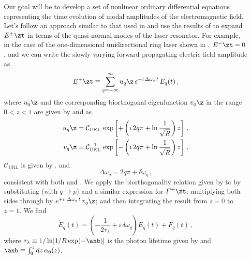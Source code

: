 Our goal will be to develop a set of nonlinear ordinary differential equations representing the time evolution of modal amplitudes of the electromagnetic field. Let's follow an approach similar to that used in  and use the results of  to expand $E^\pm\zt$ in terms of the quasi-normal modes of the laser resonator. For example, in the case of the one-dimensional unidirectional ring laser shown in , $E^{-}\zt = 0$, and we can write the slowly-varying forward-propagating electric field amplitude as
\begin{equation}
  \label{eqn:mml_e_1d_zt_url}
  E^{+}\zt \equiv \sum_{q = -\infty}^\infty u_q\z\, e^{-i\, \Delta \omega_q\, t}\, E_q(t)\, ,
\end{equation}
where $u_q\z$ and the corresponding biorthogonal eigenfunction $v_q\z$ in the range $0 < z < 1$ are given by  and  as
\begin{subequations}
  \begin{align}
    \label{eqn:sml_1d_uq_url} u_q\z &=\mathcal{C}_\mathrm{URL}\, \exp\left[ +\left( i\, 2 q \pi + \ln\frac{1}{\sqrt{R}} \right) z \right]\, , \\
    \label{eqn:sml_1d_vq_url} v_q\z &=\mathcal{C}^{-1}_\mathrm{URL}\, \exp\left[ -\left( i\, 2 q \pi + \ln\frac{1}{\sqrt{R}} \right) z \right]\, ,
  \end{align}
\end{subequations}
$\mathcal{C}_\mathrm{URL}$ is given by , and
\begin{equation}\label{eqn:mml_1d_delta_w_q_def}
  \Delta \omega_q = 2 q \pi + \delta \omega_q\, ,
\end{equation}
consistent with both  and . We apply the biorthogonality relation given by  to  by substituting  (with $q \longrightarrow p$) and a similar expression for $F^{+}\zt$; multiplying both sides through by $e^{+i\ \Delta \omega_q\, t}\, v_q\z$; and then integrating the result from $z = 0$ to $z = 1$. We find
\begin{equation} \label{eqn:mml_edot_temp}
  \dot{E}_q(t) = \left(-\frac{1}{2 \tau_\lambda} + i\, \delta \omega_q\right) E_q(t) + F_q(t)\, ,
\end{equation}
where $\tau_\lambda \equiv 1/\ln[1 / R \exp(-\anb)]$ is the photon lifetime given by  and $\anb \equiv \int_0^1 dz\, \alpha_0(z)$.

